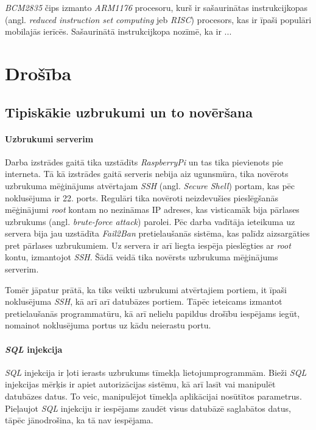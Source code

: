 \textit{BCM2835} čips izmanto \textit{ARM1176} procesoru, kurš ir sašaurinātas instrukcijkopas (angl. \textit{reduced instruction set computing} jeb \textit{RISC}) procesors, kas ir īpaši populāri mobilajās ierīcēs. Sašaurinātā instrukcijkopa nozīmē, ka ir ...


\chapter{Drošība}

\section{Tipiskākie uzbrukumi un to novēršana}
\subsubsection{Uzbrukumi serverim}
Darba izstrādes gaitā tika uzstādīts \textit{RaspberryPi} un tas tika pievienots pie interneta. Tā kā izstrādes gaitā serveris nebija aiz ugunsmūra, tika novērots uzbrukuma mēģinājums atvērtajam \textit{SSH} (angl. \textit{Secure Shell}) portam, kas pēc noklusējuma ir 22. ports. Regulāri tika novēroti neizdevušies pieslēgšanās mēģinājumi \textit{root} kontam no nezināmas IP adreses, kas visticamāk bija pārlases uzbrukums (angl. \textit{brute-force attack}) parolei. Pēc darba vadītāja ieteikuma uz servera bija jau uzstādīta \textit{Fail2Ban} pretielaušanās sistēma, kas palīdz aizsargāties pret pārlases uzbrukumiem. Uz servera ir arī liegta iespēja pieslēgties ar \textit{root} kontu, izmantojot \textit{SSH}. Šādā veidā tika novērsts uzbrukuma mēģinājums serverim.

Tomēr jāpatur prātā, ka tiks veikti uzbrukumi atvērtajiem portiem, it īpaši noklusējuma \textit{SSH}, kā arī arī datubāzes portiem. Tāpēc ieteicams izmantot pretielaušanās programmatūru, kā arī nelielu papildus drošību iespējams iegūt, nomainot noklusējuma portus uz kādu neierastu portu.

\subsubsection{\textit{SQL} injekcija}
\textit{SQL} injekcija ir ļoti ierasts uzbrukums tīmekļa lietojumprogrammām. Bieži \textit{SQL} injekcijas mērķis ir apiet autorizācijas sistēmu, kā arī lasīt vai manipulēt datubāzes datus. To veic, manipulējot tīmekļa aplikācijai nosūtītos parametrus. Pieļaujot \textit{SQL} injekciju ir iespējams zaudēt visus datubāzē saglabātos datus, tāpēc jānodrošina, ka tā nav iespējama.

